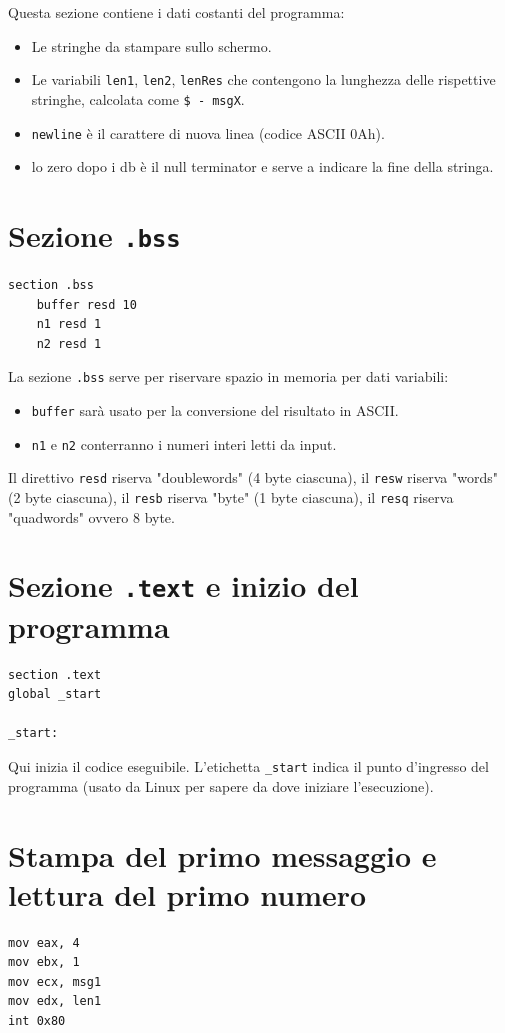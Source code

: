 \documentclass[a4paper,12pt]{article}
\begin{document}
	Questa sezione contiene i dati costanti del programma:
	\begin{itemize}
		\item Le stringhe da stampare sullo schermo.
		\item Le variabili \texttt{len1}, \texttt{len2}, \texttt{lenRes} che contengono la lunghezza delle rispettive stringhe, calcolata come \texttt{\$ - msgX}.
		\item \texttt{newline} è il carattere di nuova linea (codice ASCII 0Ah).
		\item lo zero dopo i db è il null terminator e serve a indicare la fine della stringa.
	
	\end{itemize}
	\section*{Sezione \texttt{.bss}}
	\begin{lstlisting}[language={[x86masm]Assembler}]
section .bss 
	buffer resd 10 
	n1 resd 1
	n2 resd 1
	\end{lstlisting}
	
	La sezione \texttt{.bss} serve per riservare spazio in memoria per dati variabili:
	\begin{itemize}
		\item \texttt{buffer} sarà usato per la conversione del risultato in ASCII.
		\item \texttt{n1} e \texttt{n2} conterranno i numeri interi letti da input.  
	\end{itemize}
	Il direttivo \texttt{resd} riserva "doublewords" (4 byte ciascuna), il \texttt{resw} riserva "words" (2 byte ciascuna), il \texttt{resb} riserva "byte" (1 byte ciascuna), il \texttt{resq} riserva "quadwords" ovvero 8 byte.
	
	\section*{Sezione \texttt{.text} e inizio del programma}
	\begin{lstlisting}[language={[x86masm]Assembler}]
section .text 
global _start

_start:
	\end{lstlisting}
	
	Qui inizia il codice eseguibile.  
	L’etichetta \texttt{\_start} indica il punto d’ingresso del programma (usato da Linux per sapere da dove iniziare l’esecuzione).
	
	\section*{Stampa del primo messaggio e lettura del primo numero}
	\begin{lstlisting}[language={[x86masm]Assembler}]
mov eax, 4
mov ebx, 1
mov ecx, msg1
mov edx, len1
int 0x80
	\end{lstlisting}
	
\end{document}
